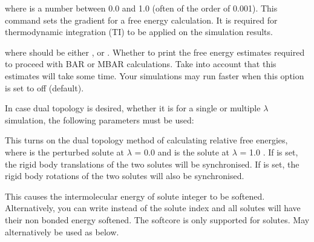 \documentclass[letterpaper,10pt,english]{sphinxmanual}
\begin{document}
where  is a number between 0.0 and 1.0 (often of the order of 0.001). This command sets the gradient for a free energy calculation. It is required for thermodynamic integration (TI) to be applied on the simulation results.

\ignorespaces 
\def\sphinxLiteralBlockLabel{\label{\detokenize{protoms:index-52}}}
%
\begin{sphinxVerbatim}[commandchars=\\\{\}]
 
\end{sphinxVerbatim}

where  should be either ,  or . Whether to print the free energy estimates required to proceed with BAR or MBAR calculations. Take into account that this estimates will take some time. Your simulations may run faster when this option is set to off (default).

In case dual topology is desired, whether it is for a single or multiple \(\lambda\) simulation, the following parameters must be used:

%
\begin{sphinxVerbatim}[commandchars=\\\{\}]
    
\end{sphinxVerbatim}

This turns on the dual topology method of calculating relative free energies, where  is the perturbed solute at \(\lambda\) = 0.0 and  is the solute at \(\lambda\) = 1.0 . If  is set, the rigid body translations of the two solutes will be synchronised. If  is set, the rigid body rotations of the two solutes will also be synchronised.

\ignorespaces 
\def\sphinxLiteralBlockLabel{\label{\detokenize{protoms:index-53}}}
%
\begin{sphinxVerbatim}[commandchars=\\\{\}]
  
\end{sphinxVerbatim}

This causes the intermolecular energy of solute integer to be softened. Alternatively, you can write  instead of the solute index and all solutes will have their non bonded energy softened. The softcore is only supported for solutes. May alternatively be used as below.
\end{document}
